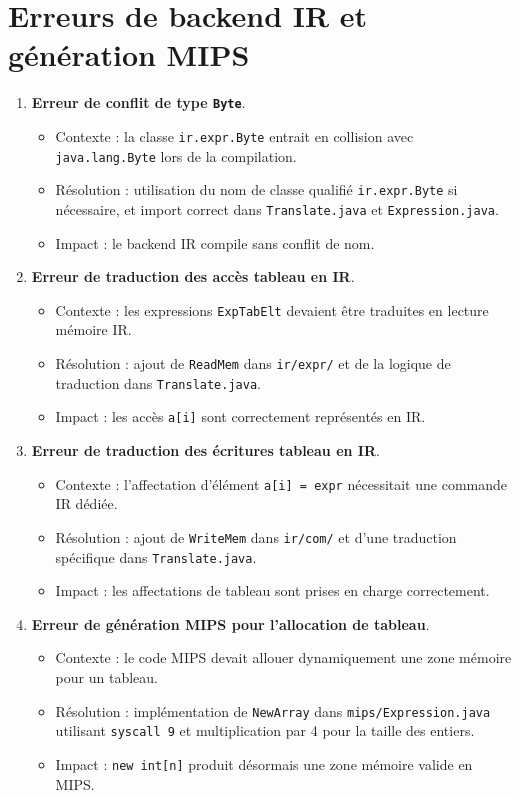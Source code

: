 \documentclass[a4paper,11pt]{article}
\begin{document}
\section{Erreurs de backend IR et génération MIPS}
\begin{enumerate}[label=\arabic*)]
  \item \textbf{Erreur de conflit de type \texttt{Byte}}.
  \begin{itemize}
    \item Contexte : la classe \texttt{ir.expr.Byte} entrait en collision avec \texttt{java.lang.Byte} lors de la compilation.
    \item Résolution : utilisation du nom de classe qualifié \texttt{ir.expr.Byte} si nécessaire, et import correct dans \texttt{Translate.java} et \texttt{Expression.java}.
    \item Impact : le backend IR compile sans conflit de nom.
  \end{itemize}

  \item \textbf{Erreur de traduction des accès tableau en IR}.
  \begin{itemize}
    \item Contexte : les expressions \texttt{ExpTabElt} devaient être traduites en lecture mémoire IR.
    \item Résolution : ajout de \texttt{ReadMem} dans \texttt{ir/expr/} et de la logique de traduction dans \texttt{Translate.java}.
    \item Impact : les accès \texttt{a[i]} sont correctement représentés en IR.
  \end{itemize}

  \item \textbf{Erreur de traduction des écritures tableau en IR}.
  \begin{itemize}
    \item Contexte : l'affectation d'élément \texttt{a[i] = expr} nécessitait une commande IR dédiée.
    \item Résolution : ajout de \texttt{WriteMem} dans \texttt{ir/com/} et d'une traduction spécifique dans \texttt{Translate.java}.
    \item Impact : les affectations de tableau sont prises en charge correctement.
  \end{itemize}

  \item \textbf{Erreur de génération MIPS pour l'allocation de tableau}.
  \begin{itemize}
    \item Contexte : le code MIPS devait allouer dynamiquement une zone mémoire pour un tableau.
    \item Résolution : implémentation de \texttt{NewArray} dans \texttt{mips/Expression.java} utilisant \texttt{syscall 9} et multiplication par 4 pour la taille des entiers.
    \item Impact : \texttt{new int[n]} produit désormais une zone mémoire valide en MIPS.
  \end{itemize}


\end{enumerate}
\end{document}
